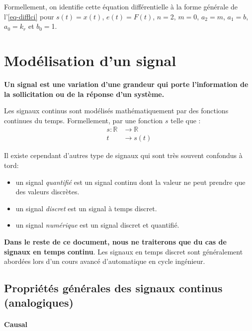 Formellement, on identifie cette équation différentielle à la forme générale 
de l'\cref{eq-difflci} pour $s(t)=x(t)$, $e(t)=F(t)$, 
$n=$2, $m=0$, $a_2=m$, $a_1=b$, $a_0=k_r$ et $b_0=$1.




\section{Modélisation d'un signal}
\textbf{Un signal est une variation d'une grandeur qui porte l'information de la 
sollicitation ou de la réponse d'un système.}

Les signaux continus sont modélisés mathématiquement par des fonctions continues 
du temps. Formellement, par une fonction $s$ telle que :
\begin{align*}
s : \mathbb{R}&\rightarrow\mathbb{R} \\  
t&\rightarrow s(t) 
\end{align*}    

Il existe cependant d'autres type de signaux qui sont très souvent confondus à tord:
\begin{itemize}
    \item un signal \emph{quantifié} est un signal continu 
          dont la valeur ne peut prendre que des valeurs discrètes. 
    \item un signal \emph{discret} est un signal à temps discret.
    \item un signal \emph{numérique} est un signal discret et quantifié.   
\end{itemize}

\textbf{Dans le reste de ce document, nous ne traiterons que
du cas de signaux en temps continu}. Les signaux en temps discret
sont généralement abordées lors d'un cours 
avancé d'automatique en cycle ingénieur.

\subsection{Propriétés générales des signaux continus (analogiques)}

\paragraph{Causal}

